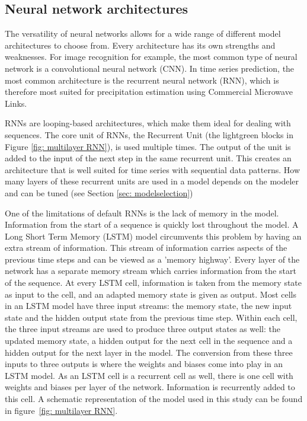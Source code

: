\documentclass[twocolumn, 10pt, a4paper]{memoir}
\begin{document}
	\subsection{Neural network architectures} \label{sec: NN architecture}
	The versatility of neural networks allows for a wide range of different model architectures to choose from. Every architecture has its own strengths and weaknesses. For image recognition for example, the most common type of neural network is a convolutional neural network (CNN). In time series prediction, the most common architecture is the recurrent neural network (RNN), which is therefore most suited for precipitation estimation using Commercial Microwave Links.
	
	RNNs are looping-based architectures, which make them ideal for dealing with sequences. The core unit of RNNs, the Recurrent Unit (the lightgreen blocks in Figure \ref{fig: multilayer RNN}), is used multiple times. The output of the unit is added to the input of the next step in the same recurrent unit. This creates an architecture that is well suited for time series with sequential data patterns. How many layers of these recurrent units are used in a model depends on the modeler and can be tuned (see Section \ref{sec: modelselection})
	
	One of the limitations of default RNNs is the lack of memory in the model. Information from the start of a sequence is quickly lost throughout the model. A Long Short Term Memory (LSTM) model circumvents this problem by having an extra stream of information. This stream of information carries aspects of the previous time steps and can be viewed as a 'memory highway'. Every layer of the network has a separate memory stream which carries information from the start of the sequence. At every LSTM cell, information is taken from the memory state as input to the cell, and an adapted memory state is given as output. Most cells in an LSTM model have three input streams: the memory state, the new input state and the hidden output state from the previous time step. Within each cell, the three input streams are used to produce three output states as well: the updated memory state, a hidden output for the next cell in the sequence and a hidden output for the next layer in the model. The conversion from these three inputs to three outputs is where the weights and biases come into play in an LSTM model. As an LSTM cell is a recurrent cell as well, there is one cell with weights and biases per layer of the network. Information is recurrently added to this cell. A schematic representation of the model used in this study can be found in figure~\ref{fig: multilayer RNN}.
	
\end{document}
